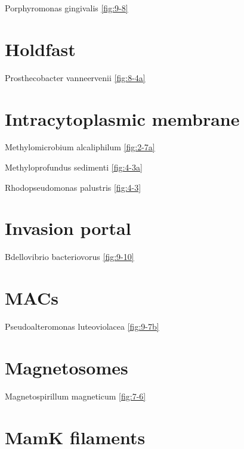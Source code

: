 \documentclass[]{tufte-book}
\begin{document}
Porphyromonas gingivalis \ref{fig:9-8}

\hypertarget{holdfast}{%
\section*{Holdfast}\label{holdfast}}

Prosthecobacter vanneervenii \ref{fig:8-4a}

\hypertarget{intracytoplasmic-membrane-1}{%
\section*{Intracytoplasmic membrane}\label{intracytoplasmic-membrane-1}}

Methylomicrobium alcaliphilum \ref{fig:2-7a}

Methyloprofundus sedimenti \ref{fig:4-3a}

Rhodopseudomonas palustris \ref{fig:4-3}

\hypertarget{invasion-portal}{%
\section*{Invasion portal}\label{invasion-portal}}

Bdellovibrio bacteriovorus \ref{fig:9-10}

\hypertarget{macs}{%
\section*{MACs}\label{macs}}

Pseudoalteromonas luteoviolacea \ref{fig:9-7b}

\hypertarget{magnetosomes}{%
\section*{Magnetosomes}\label{magnetosomes}}

Magnetospirillum magneticum \ref{fig:7-6}

\hypertarget{mamk-filaments}{%
\section*{MamK filaments}\label{mamk-filaments}}
\end{document}
